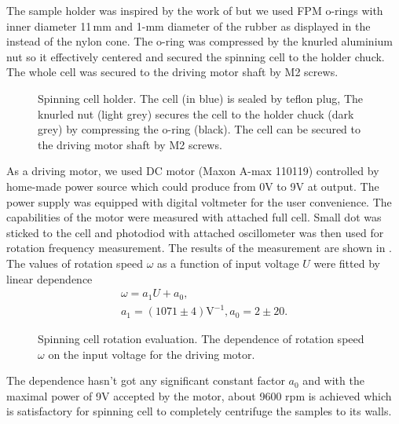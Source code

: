 The sample holder was inspired by the work of \textcite{Shriver1974} but we
used FPM o-rings with inner diameter 11\,mm and 1-mm diameter of the rubber as
displayed in the  instead of the nylon cone. The
o-ring was compressed by the knurled aluminium nut so it effectively centered
and secured the spinning cell to the holder chuck. The whole cell was secured
to the driving motor shaft by M2 screws.

\begin{figure}
	\centering
	
	\caption{Spinning cell holder. The cell (in blue) is sealed by teflon plug,
		The knurled nut (light grey) secures the cell to the holder chuck (dark
		grey) by compressing the o-ring (black). The cell can be secured to the
		driving motor shaft by M2 screws.}
	\label{\figlabel{spinning_cell:drawing}}
\end{figure}

As a driving motor, we used DC motor (Maxon A-max 110119) controlled by
home-made power source which could produce from 0V to 9V at output. The
power supply was equipped with digital voltmeter for the user convenience. The
capabilities of the motor were measured with attached full cell. Small dot
was sticked to the cell and photodiod with attached oscillometer was then used
for rotation frequency measurement. The results of the measurement are shown
in . The values of rotation speed $\omega$
as a function of input voltage $U$ were fitted by linear dependence
\begin{gather*}
	\omega = a_1U + a_0,\\
	a_1 = (1071 \pm 4) \text{V}^{-1}, a_0 = 2 \pm 20.
\end{gather*}

\begin{figure}
	\centering
	
	\caption{Spinning cell rotation evaluation. The dependence of rotation
		speed $\omega$ on the input voltage for the driving motor.}
	\label{\figlabel{spinning_cell:rotation}}
\end{figure}

The dependence hasn't got any significant constant factor $a_0$ and with the
maximal power of 9V accepted by the motor, about 9600 rpm is achieved which
is satisfactory for spinning cell to completely centrifuge the samples to its
walls.
